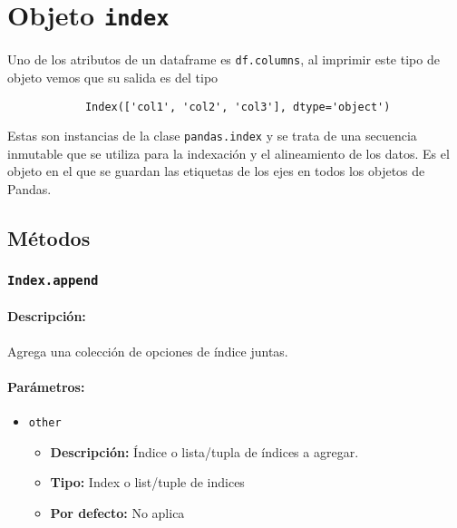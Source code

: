     \section{Objeto \texttt{index}}

    Uno de los atributos de un dataframe es \texttt{df.columns}, al imprimir este tipo de objeto vemos que su salida es del tipo

    \begin{verbatim}
            Index(['col1', 'col2', 'col3'], dtype='object')
            \end{verbatim}

    Estas son instancias de la clase \texttt{pandas.index} y se trata de una secuencia inmutable que se utiliza para la indexación y el alineamiento de los datos. Es el objeto en el que se guardan las etiquetas de los ejes en todos los objetos de Pandas.

    \subsection{Métodos}

    \subsubsection{\texttt{Index.append}}

    \paragraph{Descripción:}
    Agrega una colección de opciones de índice juntas.

    \paragraph{Parámetros:}

    \begin{itemize}
        \item \texttt{other}
            \begin{itemize}
                \item \textbf{Descripción:} Índice o lista/tupla de índices a agregar.
                \item \textbf{Tipo:} Index o list/tuple de indices
                \item \textbf{Por defecto:} No aplica
            \end{itemize}
    \end{itemize}

